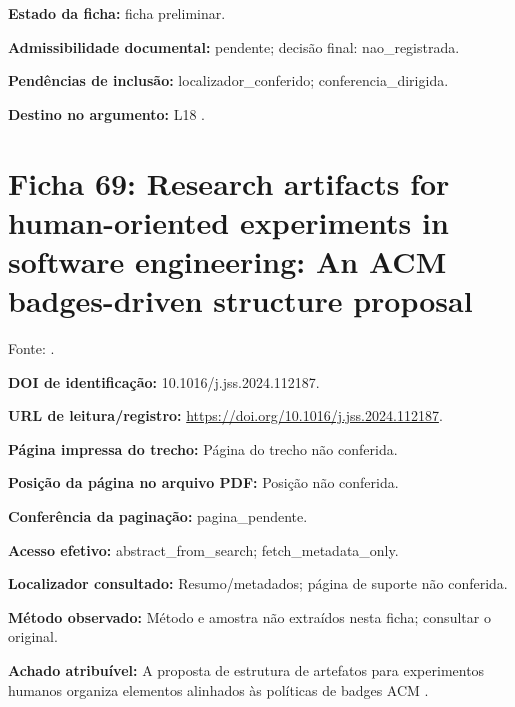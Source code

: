 \noindent\textbf{Estado da ficha:} ficha preliminar.\par\medskip

\noindent\textbf{Admissibilidade documental:} pendente; decisão final: nao\_registrada.\par\medskip

\noindent\textbf{Pendências de inclusão:} localizador\_conferido; conferencia\_dirigida.\par\medskip

\noindent\textbf{Destino no argumento:} L18 .

\clearpage\section*{Ficha 69: Research artifacts for human-oriented experiments in software engineering: An ACM badges-driven structure proposal}

Fonte: \citet{eng18}.

\noindent\textbf{DOI de identificação:} 10.1016/j.jss.2024.112187.\par\medskip

\noindent\textbf{URL de leitura/registro:} \url{https://doi.org/10.1016/j.jss.2024.112187}.\par\medskip

\noindent\textbf{Página impressa do trecho:} Página do trecho não conferida.\par\medskip

\noindent\textbf{Posição da página no arquivo PDF:} Posição não conferida.\par\medskip

\noindent\textbf{Conferência da paginação:} pagina\_pendente.\par\medskip

\noindent\textbf{Acesso efetivo:} abstract\_from\_search; fetch\_metadata\_only.\par\medskip

\noindent\textbf{Localizador consultado:} Resumo/metadados; página de suporte não conferida.\par\medskip

\noindent\textbf{Método observado:} Método e amostra não extraídos nesta ficha; consultar o original.\par\medskip

\noindent\textbf{Achado atribuível:} A proposta de estrutura de artefatos para experimentos humanos organiza elementos alinhados às políticas de badges ACM \citep{eng18}.\par\medskip

